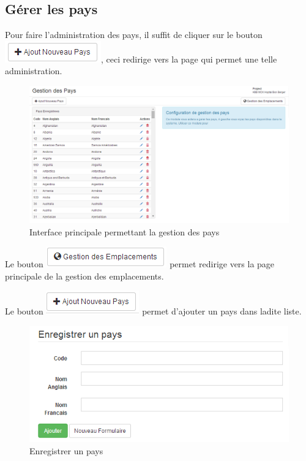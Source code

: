 \documentclass[12pt,a4paper]{report}
\begin{document}
\subsection{Gérer les pays}
Pour faire l'administration des pays, il suffit de cliquer sur le bouton \includegraphics[scale=0.7]{pic/AddNewCountry.png}, ceci redirige vers la page qui permet une telle administration.
\begin{figure}[h]
\begin{center}
\includegraphics[width=14cm]{pic/AdminCountry.png}
\end{center}
\caption{Interface principale permettant la gestion des pays}
\label{Interface principale permettant la gestion des pays}
\end{figure}

Le bouton \includegraphics[scale=0.7]{pic/GestionEmplacement.png}  permet redirige vers la page principale de la gestion des emplacements.

Le bouton \includegraphics[scale=0.7]{pic/AddCountry.png} permet d'ajouter un pays dans ladite liste.

\begin{figure}[h]
\begin{center}
\includegraphics[width=16cm]{pic/SaveCountry.png}
\end{center}
\caption{Enregistrer un pays}
\label{Enregistrer un pays}
\end{figure}
\end{document}
